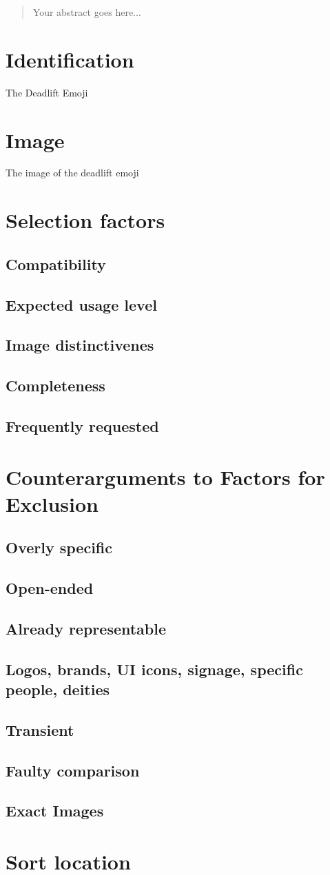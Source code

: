 \documentclass{article}
\begin{document}
\begin{abstract}
Your abstract goes here...
\end{abstract}
\section{Identification}
The Deadlift Emoji

\section{Image}
The image of the deadlift emoji

\section{Selection factors}
\subsection{Compatibility}
\subsection{Expected usage level}
\subsection{Image distinctivenes}
\subsection{Completeness}
\subsection{Frequently requested}

\section{Counterarguments to Factors for Exclusion}
\subsection{Overly specific}
\subsection{Open-ended}
\subsection{Already representable}
\subsection{Logos, brands, UI icons, signage, specific people, deities}
\subsection{Transient}
\subsection{Faulty comparison}
\subsection{Exact Images}

\section{Sort location}
\end{document}
